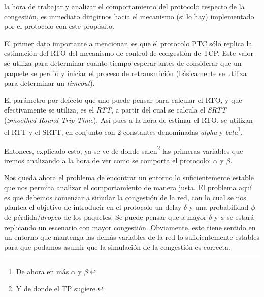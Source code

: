  la hora de trabajar y analizar el comportamiento del protocolo
respecto de la congesti\'on, es inmediato dirigirnos hacia el mecanismo (si lo
hay) implementado por el protocolo con este prop\'osito.

\par El primer dato importante a mencionar, es que el protocolo PTC s\'olo replica
la estimaci\'on del RTO del mecanismo de control de congesti\'on de TCP\cite{rfc5681}.
Este valor se utiliza para determinar cuanto tiempo esperar antes de considerar que un
paquete se perdi\'o y iniciar el proceso de retransmici\'on (b\'asicamente se
utiliza para determinar un \textit{timeout}).

\par El par\'ametro por defecto que uno puede pensar para calcular el RTO, y
que efectivamente se utiliza, es el \textit{RTT}\cite{rfc1323}\cite{karns_algorithm}\cite{rfc6298},
a partir del cual se calcula el \textit{SRTT} (\textit{Smoothed Round
Trip Time}\cite{rfc6298}). As\'i pues a la hora de estimar el RTO, se
utilizan el RTT y el SRTT, en conjunto con 2 constantes denominadas \emph{alpha}
y \emph{beta}\footnote{De ahora en m\'as $\alpha$ y $\beta$.}\cite{rfc6298}.

\par Entonces, explicado esto, ya se ve de donde salen\footnote{Y de donde el
TP sugiere.} las primeras variables que iremos analizando a la hora de ver como
se comporta el protocolo: $\alpha$ y $\beta$.

\par Nos queda ahora el problema de encontrar un entorno lo suficientemente estable
que nos permita analizar el comportamiento de manera justa. El problema aqu\'i
es que debemos comenzar a simular la congesti\'on de la red, con lo cual se
nos plantea el objetivo de introducir en el protocolo un delay
$\delta$ y una probabilidad $\phi$ de p\'erdida/$dropeo$ de los paquetes. 
Se puede pensar que a mayor $\delta$ y $\phi$ se estar\'a replicando un
escenario con mayor congesti\'on. Obviamente, esto tiene sentido
en un entorno que mantenga las dem\'as variables de la red lo suficientemente
estables para que podamos asumir que la simulaci\'on de la congesti\'on es
correcta.

